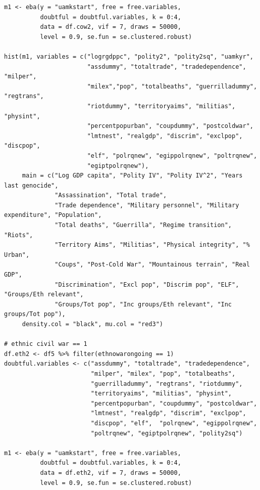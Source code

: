 \documentclass[a4paper,12pt]{article}
\begin{document}
\begin{verbatim}
m1 <- eba(y = "uamkstart", free = free.variables,
          doubtful = doubtful.variables, k = 0:4,
          data = df.cow2, vif = 7, draws = 50000,
          level = 0.9, se.fun = se.clustered.robust)

hist(m1, variables = c("logrgdppc", "polity2", "polity2sq", "uamkyr",
                       "assdummy", "totaltrade", "tradedependence", "milper",
                       "milex","pop", "totalbeaths", "guerrilladummy", "regtrans",
                       "riotdummy", "territoryaims", "militias", "physint",
                       "percentpopurban", "coupdummy", "postcoldwar",
                       "lmtnest", "realgdp", "discrim", "exclpop", "discpop",
                       "elf", "polrqnew", "egippolrqnew", "poltrqnew",
                       "egiptpolrqnew"),
     main = c("Log GDP capita", "Polity IV", "Polity IV^2", "Years last genocide",
              "Assassination", "Total trade", 
              "Trade dependence", "Military personnel", "Military expenditure", "Population", 
              "Total deaths", "Guerrilla", "Regime transition", "Riots",
              "Territory Aims", "Militias", "Physical integrity", "% Urban",
              "Coups", "Post-Cold War", "Mountainous terrain", "Real GDP",
              "Discrimination", "Excl pop", "Discrim pop", "ELF", "Groups/Eth relevant", 
              "Groups/Tot pop", "Inc groups/Eth relevant", "Inc groups/Tot pop"),
     density.col = "black", mu.col = "red3")
     
# ethnic civil war == 1
df.eth2 <- df5 %>% filter(ethnowarongoing == 1)
doubtful.variables <- c("assdummy", "totaltrade", "tradedependence",
                        "milper", "milex", "pop", "totalbeaths",
                        "guerrilladummy", "regtrans", "riotdummy",
                        "territoryaims", "militias", "physint",
                        "percentpopurban", "coupdummy", "postcoldwar",
                        "lmtnest", "realgdp", "discrim", "exclpop", 
                        "discpop", "elf",  "polrqnew", "egippolrqnew",
                        "poltrqnew", "egiptpolrqnew", "polity2sq")

m1 <- eba(y = "uamkstart", free = free.variables,
          doubtful = doubtful.variables, k = 0:4,
          data = df.eth2, vif = 7, draws = 50000,
          level = 0.9, se.fun = se.clustered.robust)


\end{verbatim}
\end{document}
